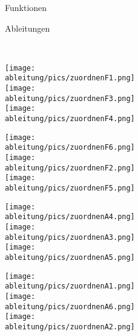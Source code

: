 \begin{Exercise}[title={\raggedright Markiere jeweils in welchen Bereichen das Schaubild der Funktionen steigt bzw. fällt, die Ableitungen negativ bzw. positiv sind und ordne dann die Schaubilder der Funktioinen den passenden Schaubildern der Ableitungen zu.}, label=schaubildZuordnenA1]
	\begin{minipage}{\textwidth}
		\begin{minipage}{0.5\textwidth}
			\centering Funktionen
		\end{minipage}
		\begin{minipage}{0.5\textwidth}
			\centering Ableitungen
		\end{minipage}\\
		\begin{minipage}[][][c]{0.24\textwidth}
			\centering\texttt{[image: \\ableitung/pics/zuordnenF1.png]}\vspace{0.2cm}\\
			\centering\texttt{[image: \\ableitung/pics/zuordnenF3.png]}\vspace{0.2cm}\\
			\centering\texttt{[image: \\ableitung/pics/zuordnenF4.png]}
		\end{minipage}
		\begin{minipage}[][][c]{0.24\textwidth}
			\centering\texttt{[image: \\ableitung/pics/zuordnenF6.png]}\vspace{0.2cm}\\
			\centering\texttt{[image: \\ableitung/pics/zuordnenF2.png]}\vspace{0.2cm}\\
			\centering\texttt{[image: \\ableitung/pics/zuordnenF5.png]}
		\end{minipage}
		\begin{minipage}[][][c]{0.24\textwidth}
			\centering\texttt{[image: \\ableitung/pics/zuordnenA4.png]}\vspace{0.2cm}\\
			\centering\texttt{[image: \\ableitung/pics/zuordnenA3.png]}\vspace{0.2cm}\\
			\centering\texttt{[image: \\ableitung/pics/zuordnenA5.png]}
		\end{minipage}
		\begin{minipage}[][][c]{0.24\textwidth}
			\centering\texttt{[image: \\ableitung/pics/zuordnenA1.png]}\vspace{0.2cm}\\
			\centering\texttt{[image: \\ableitung/pics/zuordnenA6.png]}\vspace{0.2cm}\\
			\centering\texttt{[image: \\ableitung/pics/zuordnenA2.png]}
		\end{minipage}
	\end{minipage}
\end{Exercise}\newpage
